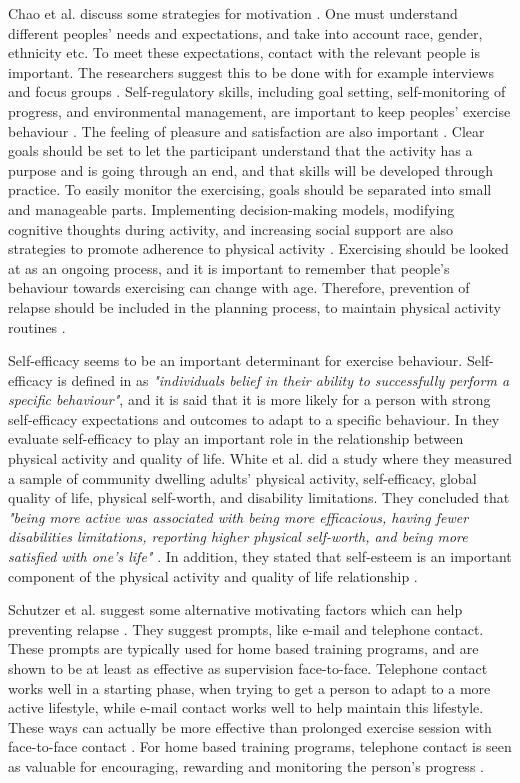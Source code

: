 Chao et al. discuss some strategies for motivation \cite{chao}. One must understand different peoples' needs and expectations, and take into account race, gender, ethnicity etc. To meet these expectations, contact with the relevant people is important. The researchers suggest this to be done with for example interviews and focus groups \cite{chao}. Self-regulatory skills, including goal setting, self-monitoring of progress, and environmental management, are important to keep peoples' exercise behaviour \cite{chao} \cite{schutzer}. The feeling of pleasure and satisfaction are also important \cite{schutzer}.  Clear goals should be set to let the participant understand that the activity has a purpose and is going through an end, and that skills will be developed through practice. To easily monitor the exercising, goals should be separated into small and manageable parts. Implementing decision-making models, modifying cognitive thoughts during activity, and increasing social support are also strategies to promote adherence to physical activity \cite{chao}.  Exercising should be looked at as an ongoing process, and it is important to remember that people's behaviour towards exercising can change with age. Therefore, prevention of relapse should be included in the planning process, to maintain physical activity routines \cite{chao}. 

Self-efficacy seems to be an important determinant for exercise behaviour. Self-efficacy is defined in \cite{schutzer} as \emph{"individuals belief in their ability to successfully perform a specific behaviour"}, and it is said that it is more likely for a person with strong self-efficacy expectations and outcomes to adapt to a specific behaviour. In \cite{white} they evaluate self-efficacy to play an important role in the relationship between physical activity and quality of life. White et al. did a study where they measured a sample of community dwelling adults' physical activity, self-efficacy, global quality of life, physical self-worth, and disability limitations. They concluded that \emph{"being more active was associated with being more efficacious, having fewer disabilities limitations, reporting higher physical self-worth, and being more satisfied with one's life"} \cite{white}. In addition, they stated that self-esteem is an important component of the physical activity and quality of life relationship \cite{white}. 

Schutzer et al. suggest some alternative motivating factors which can help preventing relapse \cite{schutzer}. They suggest prompts, like e-mail and telephone contact. These prompts are typically used for home based training programs, and are shown to be at least as effective as supervision face-to-face. Telephone contact works well in a starting phase, when trying to get a person to adapt to a more active lifestyle, while e-mail contact works well to help maintain this lifestyle. These ways can actually be more effective than prolonged exercise session with face-to-face contact \cite{schutzer}. For home based training programs, telephone contact is seen as valuable for encouraging, rewarding and monitoring the person's progress \cite{chao}.  

